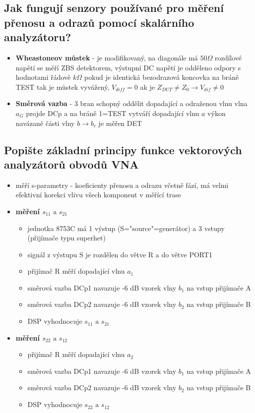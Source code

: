\documentclass[a4paper]{article}
\begin{document}
\subsection{\textbf{Jak fungují senzory používané pro měření přenosu a odrazů pomocí skalárního analyzátoru? }}
\begin{itemize}
	\item \textbf{Wheastoneov můstek} - je modifikovaný, na diagonále má $50 \Omega$
	\subitem rozdílové napětí se měří ZBS detektorem, výstupní DC napětí je odděleno odpory s hodnotami řádově $k\Omega$
	\subitem pokud je identická bezodrazová koncovka na bráně TEST tak je můstek vyvážený, $V_{diff}=0$
	\subitem ak je $Z_{DUT}\neq Z_0 \to V_{dif}\neq 0$
	\item \textbf{Směrová vazba} - 3 bran schopný oddělit dopadající a odraženou vlnu
	\subitem vlna $a_G$ projde DCp a na bráně 1=TEST vytváří dopadající vlnu $a$
	\subitem výkon navázané části vlny $b \to b_c$ je měřen DET
\end{itemize}
\subsection{\textbf{Popište základní principy funkce vektorových analyzátorů obvodů VNA}}
\begin{itemize}
	\item měří s-parametry - koeficienty přenosu a odrazu včetně fází, má velmi efektivní korekci vlivu všech komponent v měřící trase
	\item \textbf{měření $s_{11} \text{ a } s_{21}$}
	\begin{itemize}
		\item jednotka 8753C má 1 výstup (S="source"=generátor) a 3 vstupy (přijímače typu superhet)
		\item signál z výstupu S je rozdělen do větve R a do větve PORT1
		\item přijímač R měří dopadající vlnu $a_1$
		\item směrová vazba DCp1 navazuje -6 dB vzorek vlny $b_1$ na vstup přijímače A
		\item směrová vazba DCp2 navazuje -6 dB vzorek vlny $b_2$ na vstup přijímače B
		\item DSP vyhodnocuje $s_{11} \text{ a } s_{21}$
	\end{itemize}
	\item \textbf{měření $s_{22} \text{ a } s_{12}$}
	\begin{itemize}
		\item přijímač R měří dopadající vlnu $a_2$
		\item směrová vazba DCp1 navazuje -6 dB vzorek vlny $b_1$ na vstup přijímače A
		\item směrová vazba DCp2 navazuje -6 dB vzorek vlny $b_2$ na vstup přijímače B
		\item DSP vyhodnocuje $s_{22} \text{ a } s_{12}$
	\end{itemize}
\end{itemize}
\end{document}
